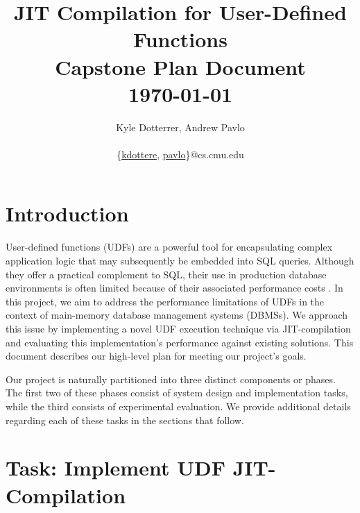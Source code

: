 \documentclass{vldb}
\newcommand{\paperTitle}{JIT Compilation for User-Defined Functions\\ 
    \large Capstone Plan Document\\
    \today}
\begin{document}
\title{\paperTitle}

\author{
    \alignauthor Kyle Dotterrer, Andrew Pavlo\\
    \\
    \email 
        \{\href{mailto:kdottere@cs.cmu.edu}{kdottere},
        \href{mailto:pavlo@cs.cmu.edu}{pavlo}\}@cs.cmu.edu\\
}

\makeatletter
\def\@copyrightspace{\relax}
\makeatother

\maketitle


\section{Introduction}

User-defined functions (UDFs) are a powerful tool for encapsulating complex application logic that may subsequently be embedded into SQL queries. Although they offer a practical complement to SQL, their use in production database environments is often limited because of their associated performance costs \cite{froid, apfel}. In this project, we aim to address the performance limitations of UDFs in the context of main-memory database management systems (DBMSs). We approach this issue by implementing a novel UDF execution technique via JIT-compilation and evaluating this implementation's performance against existing solutions. This document describes our high-level plan for meeting our project's goals.

Our project is naturally partitioned into three distinct components or phases. The first two of these phases consist of system design and implementation tasks, while the third consists of experimental evaluation. We provide additional details regarding each of these tasks in the sections that follow.


\section{Task: Implement UDF JIT-Compilation}
\end{document}
